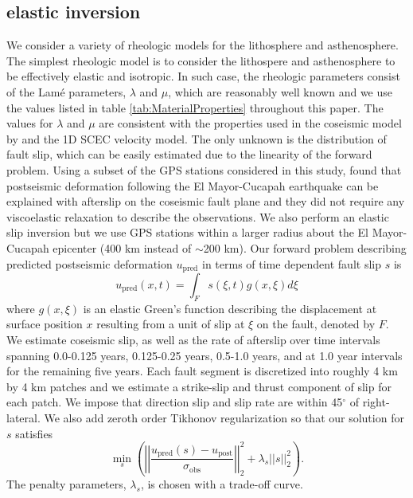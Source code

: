 \documentclass[1p]{elsarticle}
\begin{document}
\subsection{elastic inversion}\label{sec:ElasticInversion}    
We consider a variety of rheologic models for the lithosphere and asthenosphere. The simplest rheologic model is to consider the lithospere and asthenosphere to be effectively elastic and isotropic.  In such case, the rheologic parameters consist of the Lam\'e parameters, $\lambda$ and $\mu$, which are reasonably well known and we use the values listed in table \ref{tab:MaterialProperties} throughout this paper. The values for $\lambda$ and $\mu$ are consistent with the properties used in the coseismic model by \citet{Wei2011} and the 1D SCEC velocity model.  The only unknown is the distribution of fault slip, which can be easily estimated due to the linearity of the forward problem.  Using a subset of the GPS stations considered in this study, \citet{Rollins2015} found that postseismic deformation following the El Mayor-Cucapah earthquake can be explained with afterslip on the coseismic fault plane and they did not require any viscoelastic relaxation to describe the observations. We also perform an elastic slip inversion but we use GPS stations within a larger radius about the El Mayor-Cucapah epicenter (400 km instead of $\sim$200 km). Our forward problem describing predicted postseismic deformation $u_\mathrm{pred}$ in terms of time dependent fault slip $s$ is
\begin{equation}\label{eq:ElasticForward}
  u_\mathrm{pred}(x,t) = \int_F s(\xi,t)g(x,\xi)d\xi 
\end{equation}           
where $g(x,\xi)$ is an elastic Green's function describing the displacement at surface position $x$ resulting from a unit of slip at $\xi$ on the fault, denoted by $F$.  We estimate coseismic slip, as well as the rate of afterslip over time intervals spanning 0.0-0.125 years, 0.125-0.25 years, 0.5-1.0 years, and at 1.0 year intervals for the remaining five years.  Each fault segment is discretized into roughly 4 km by 4 km patches and we estimate a strike-slip and thrust component of slip for each patch. We impose that direction slip and slip rate are within 45$^\circ$ of right-lateral. We also add zeroth order Tikhonov regularization so that our solution for $s$ satisfies
\begin{equation}\label{eq:ElasticObjective}
  \min_s \left(\left|\left|\frac{u_\mathrm{pred}(s) - u_\mathrm{post}}                
                                {\sigma_\mathrm{obs}}\right|\right|_2^2 + 
                                \lambda_s||s||_2^2\right). 
\end{equation}
The penalty parameters, $\lambda_s$, is chosen with a trade-off curve. 
\end{document}
